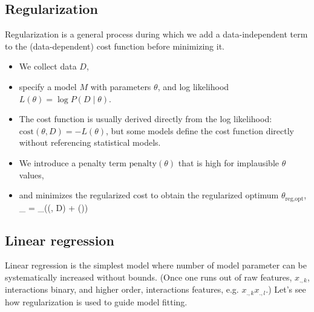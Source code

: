 \subsection{Regularization}
\no Regularization is a general process during which we add a data-independent term to the (data-dependent) cost function before minimizing it.
\begin{itemize}
	\item We collect data $D$, 
	\item specify a model $M$ with parameters $\theta$, and log likelihood $L(\theta) = \log P(D\;|\;\theta)$.
	\item The cost function is usually derived directly from the log likelihood: $\text{cost}(\theta, D) = - L(\theta)$, but some models define the cost function directly without referencing statistical models.
	\item We introduce a penalty term $\text{penalty}(\theta)$ that is high for implausible $\theta$ values,
	\item and minimizes the regularized cost to obtain the regularized optimum $\theta_\text{reg,opt}$,
	\be
		\theta_ = _\theta ((\theta, D) + (\theta))
	\ee
\end{itemize}

\subsection{Linear regression}
Linear regression is the simplest model where number of model parameter can be systematically increased without bounds. (Once one runs out of raw features, $x_{.,k}$, interactions binary, and higher order, interactions features, e.g. $x_{.,k} x_{.,l}$.) Let's see how regularization is used to guide model fitting.

